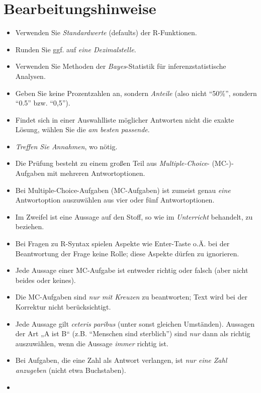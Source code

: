 \documentclass[
  a4paper,
  DIV=11]{scrreprt}
\providecommand{\tightlist}{%
  \setlength{\itemsep}{0pt}\setlength{\parskip}{0pt}}\usepackage{longtable,booktabs,array}
\theoremstyle{definition}
\theoremstyle{remark}
\begin{document}
\hypertarget{bearbeitungshinweise}{%
\section{Bearbeitungshinweise}\label{bearbeitungshinweise}}

\begin{itemize}
\tightlist
\item
  Verwenden Sie \emph{Standardwerte} (defaults) der R-Funktionen.
\item
  Runden Sie ggf. auf \emph{eine Dezimalstelle}.
\item
  Verwenden Sie Methoden der \emph{Bayes}-Statistik für
  inferenzstatistische Analysen.
\item
  Geben Sie keine Prozentzahlen an, sondern \emph{Anteile} (also nicht
  ``50\%'', sondern ``0.5'' bzw. ``0,5'').
\item
  Findet sich in einer Auswahlliste möglicher Antworten nicht die exakte
  Lösung, wählen Sie die \emph{am besten passende}.
\item
  \emph{Treffen Sie Annahmen}, wo nötig.
\item
  Die Prüfung besteht zu einem großen Teil aus \emph{Multiple-Choice}-
  (MC-)-Aufgaben mit mehreren Antwortoptionen.
\item
  Bei Multiple-Choice-Aufgaben (MC-Aufgaben) ist zumeist genau
  \emph{eine} Antwortoption auszuwählen aus vier oder fünf
  Antwortoptionen.
\item
  Im Zweifel ist eine Aussage auf den Stoff, so wie im \emph{Unterricht}
  behandelt, zu beziehen.
\item
  Bei Fragen zu R-Syntax spielen Aspekte wie Enter-Taste o.Ä. bei der
  Beantwortung der Frage keine Rolle; diese Aspekte dürfen zu
  ignorieren.
\item
  Jede Aussage einer MC-Aufgabe ist entweder richtig oder falsch (aber
  nicht beides oder keines).
\item
  Die MC-Aufgaben sind \emph{nur mit Kreuzen} zu beantworten; Text wird
  bei der Korrektur nicht berücksichtigt.
\item
  Jede Aussage gilt \emph{ceteris paribus} (unter sonst gleichen
  Umständen). Aussagen der Art „A ist B`` (z.B. ``Menschen sind
  sterblich'') sind \emph{nur} dann als richtig auszuwählen, wenn die
  Aussage \emph{immer} richtig ist.
\item
  Bei Aufgaben, die eine Zahl als Antwort verlangen, ist \emph{nur eine
  Zahl anzugeben} (nicht etwa Buchstaben).
\item

\end{itemize}
\end{document}
